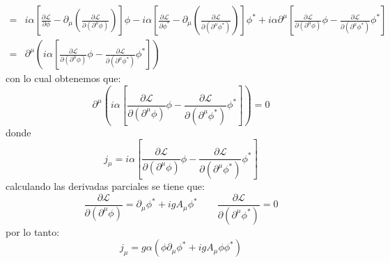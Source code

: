 \begin{itemize}
\begin{align*}
        =& i\alpha \left[ \frac{\partial \mathcal{L}}{\partial \phi} - \partial_\mu \left(\frac{\partial \mathcal{L}}{\partial (\partial^\mu \phi)}\right) \right] \phi-i\alpha \left[ \frac{\partial \mathcal{L}}{\partial \phi^*} - \partial_\mu \left(\frac{\partial \mathcal{L}}{\partial (\partial^\mu \phi^*)}\right) \right] \phi^*  + i\alpha \partial^\mu \left[ \frac{\partial \mathcal{L}}{\partial (\partial^\mu \phi)} \phi  - \frac{\partial \mathcal{L}}{\partial (\partial^\mu {\phi}^*)} {\phi}^* \right]\\
        =& \partial^\mu \left(i\alpha\left[ \frac{\partial \mathcal{L}}{\partial (\partial^\mu \phi)} \phi  - \frac{\partial \mathcal{L}}{\partial (\partial^\mu {\phi}^*)} {\phi}^* \right]\right)
    \end{align*}
    con lo cual obtenemos que:
    \begin{equation*}
        \partial^\mu \left(i\alpha\left[ \frac{\partial \mathcal{L}}{\partial (\partial^\mu \phi)} \phi  - \frac{\partial \mathcal{L}}{\partial (\partial^\mu {\phi}^*)} {\phi}^* \right]\right) = 0
    \end{equation*}
    donde 
     \begin{equation*}
         j_\mu = i\alpha\left[ \frac{\partial \mathcal{L}}{\partial (\partial^\mu \phi)} \phi  - \frac{\partial \mathcal{L}}{\partial (\partial^\mu {\phi}^*)} {\phi}^* \right]
     \end{equation*}
     calculando las derivadas parciales se tiene que:
     \begin{equation*}
        \frac{\partial \mathcal{L}}{\partial (\partial^\mu \phi)} =\partial_\mu \phi^* +igA_\mu \phi^*  
        \qquad 
        \frac{\partial \mathcal{L}}{\partial (\partial^\mu \phi^*)} =0
     \end{equation*}
     por lo tanto:
     \begin{equation*}
         j_\mu = g\alpha \left(\phi \partial_\mu \phi^* +igA_\mu \phi \phi^*  \right)
     \end{equation*}
\end{itemize}